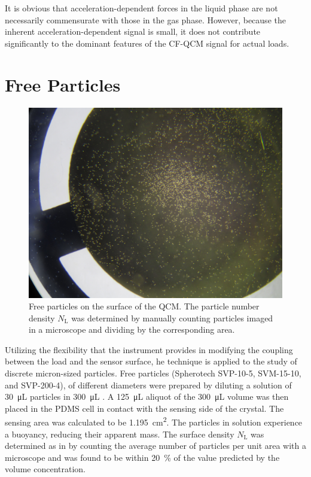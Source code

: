 It is obvious that acceleration-dependent forces in the liquid phase are not
necessarily commensurate with those in the gas phase.  However, because the
inherent acceleration-dependent signal is small, it does not contribute
significantly to the dominant features of the CF-QCM signal for actual loads.

\section{Free Particles}
\begin{figure}
\centering
\includegraphics[keepaspectratio,width=12cm]{qcm/figures/qcm_beadssurface.jpg}
\caption{Free particles on the surface of the QCM\@.  The particle number
				density $N_\mathrm{L}$ was determined by manually counting
				particles imaged in a microscope and dividing by the corresponding area.}
\label{fig:countparticles}
\end{figure}
Utilizing the flexibility that the instrument provides in modifying the
coupling between the load and the sensor surface, he technique is applied
to the study of discrete micron-sized particles.
Free particles (Spherotech SVP-10-5, SVM-15-10, and SVP-200-4), of
different diameters were prepared by diluting a solution of
\SI{30}{\micro\liter} particles in \SI{300}{\micro\liter} .  A
\SI{125}{\micro\liter} aliquot of the \SI{300}{\micro\liter} volume was
then placed in the PDMS cell in contact with the sensing side of the
crystal.  The sensing area was calculated to be
\SI{1.195}{\centi\meter\squared}.  The particles in solution experience a
buoyancy, reducing their apparent mass. The surface density
$N_\mathrm{L}$ was determined as in  by counting the average number of particles
per unit area with a microscope and was found to be within
\SI{20}{\percent} of the value predicted by the volume concentration.

